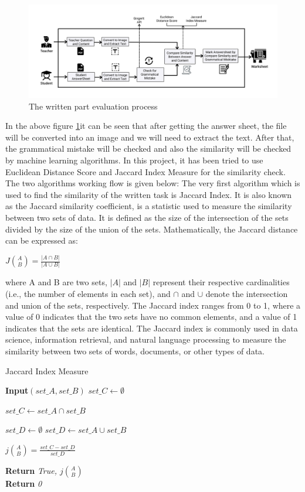 \begin{figure}[H]
    \centering
    \includegraphics[scale=.07]{img/written.png}
    \caption{The written part evaluation process}
    \label{fig:written}
\end{figure}

In the above figure \ref{fig:written}it can be seen that after getting the answer sheet, the file will be converted into an image and we will need to extract the text. After that, the grammatical mistake will be checked and also the similarity will be checked by machine learning algorithms. In this project, it has been tried to use Euclidean Distance Score and Jaccard Index Measure for the similarity check. The two algorithms working flow is given below:
The very first algorithm which is used to find the similarity of the written task is Jaccard Index. It is also known as the Jaccard similarity coefficient, is a statistic used to measure the similarity between two sets of data. It is defined as the size of the intersection of the sets divided by the size of the union of the sets. Mathematically, the Jaccard distance can be expressed as:

$J\binom{A}{B} = \frac{ |A \cap B|} {|A \cup B|}$

where A and B are two sets, $|A|$ and $|B|$ represent their respective cardinalities (i.e., the number of elements in each set), and $\cap$ and $\cup$ denote the intersection and union of the sets, respectively. The Jaccard index ranges from 0 to 1, where a value of 0 indicates that the two sets have no common elements, and a value of 1 indicates that the sets are identical. The Jaccard index is commonly used in data science, information retrieval, and natural language processing to measure the similarity between two sets of words, documents, or other types of data.

\begin{algorithm}[H]
\caption{Jaccard Index Measure}\label{alg:Jaccard}
\begin{algorithmic}[1]
\State \textbf{Input}$ (set\_A, set\_B)$
\State $ set\_C \gets \emptyset $

    \State $set\_C \gets set\_A \cap set\_B$
\EndIf

\State $set\_D \gets \emptyset $
    \State $set\_D \gets set\_A \cup set\_B$
\EndIf  

\State $j\binom{A}{B} = \frac{set\_C - set\_D }{set\_D} $

    \State \textbf{Return}
\textit{True, $j\binom{A}{B}$}
\EndIf  
\\\textbf{Return}
\textit{0}
\end{algorithmic}
\end{algorithm}

